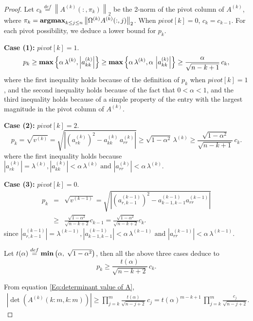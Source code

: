 \documentclass[11pt]{article}
\begin{document}
\begin{proof}
Let $c_k \stackrel{def}{=} \left\| A^{(k)} ( : , \pi_k) \right\|_2$ be the 2-norm of the pivot column of $A^{(k)}$, where $\pi_k = {\bf argmax}_{k \le j \le n} \left\| \Omega^{(k)} A^{(k)}( : , j) \right\|_2$. When $pivot[k] = 0$, $c_k = c_{k - 1}$. For each pivot possibility, we deduce a lower bound for $p_k$.

{\bf Case (1):}
$pivot[k] = 1$.
$$
p_k \ge {\bf max}\left\{\alpha \, \lambda^{(k)}, \left|a_{kk}^{(k)}\right|\right\} \ge {\bf max}\left\{\alpha \, \lambda^{(k)}, \alpha \, \left|a_{kk}^{(k)}\right|\right\} \ge \frac{\alpha}{\sqrt{n-k+1}} \, c_k,
$$
where the first inequality holds because of the definition of $p_k$ when $pivot[k] = 1$, and the second inequality holds because of the fact that $0 < \alpha < 1$, and the third inequality holds because of a simple property of the entry with the largest magnitude in the pivot column of $A^{(k)}$.

{\bf Case (2):}
$pivot[k] = 2$.
$$
p_k = \sqrt{v^{(k)}} 
= \sqrt{\left| \left( a_{r k}^{(k)} \right)^2 - a_{k k}^{(k)} \, a_{r r}^{(k)} \right|}
\ge \sqrt{1 - \alpha^2} \, \lambda^{(k)} \ge \frac{\sqrt{1 - \alpha^2}}{\sqrt{n - k + 1}} \, c_k.
$$
where the first inequality holds because $\left|a_{r k}^{(k)}\right| = \lambda^{(k)}, \left|a_{k k}^{(k)}\right| < \alpha \, \lambda^{(k)} \mbox{ and } \left|a_{r r}^{(k)}\right| < \alpha \, \lambda^{(k)}.$

{\bf Case (3):}
$pivot[k] = 0$.
\begin{eqnarray*}
p_k &=& \sqrt{v^{(k - 1)}} 
= \sqrt{\left| \left( a_{r,k-1}^{(k-1)} \right)^2 - a_{k-1 ,k-1}^{(k-1)} a_{r r}^{(k-1)} \right|} \\
&\ge& \frac{\sqrt{1 - \alpha^2}}{\sqrt{n - k + 2}} c_{k-1} = \frac{\sqrt{1 - \alpha^2}}{\sqrt{n - k + 2}} c_k.
\end{eqnarray*}
since $\left|a_{r,k-1}^{(k-1)}\right| = \lambda^{(k-1)}, \left|a_{k-1,k-1}^{(k-1)}\right| < \alpha \, \lambda^{(k-1)} \mbox{ and } \left|a_{r r}^{(k-1)}\right| < \alpha \, \lambda^{(k-1)}.$

Let $t(\alpha) \stackrel{def}{=} {\bf min}\left(\alpha, \; \sqrt{1 - \alpha^2} 
\right)$, then all the above three cases deduce to  
$$
p_k \ge \frac{t(\alpha)}{\sqrt{n - k + 2}} \, c_k.
$$ 

From equation \eqref{Eq:determinant value of A},
\begin{align}\label{Eq:lower bound of column growth factor}
\left| \det \left( A^{(k)}(k : m, k : m) \right) \right|
\ge \prod_{j = k}^m \frac{t(\alpha)}{\sqrt{n - j + 2}} \, c_j = t(\alpha)^{m - k + 1} \, \prod_{j = k}^m \frac{c_j}{\sqrt{n - j + 2}}.
\end{align}


\end{proof}
\end{document}
